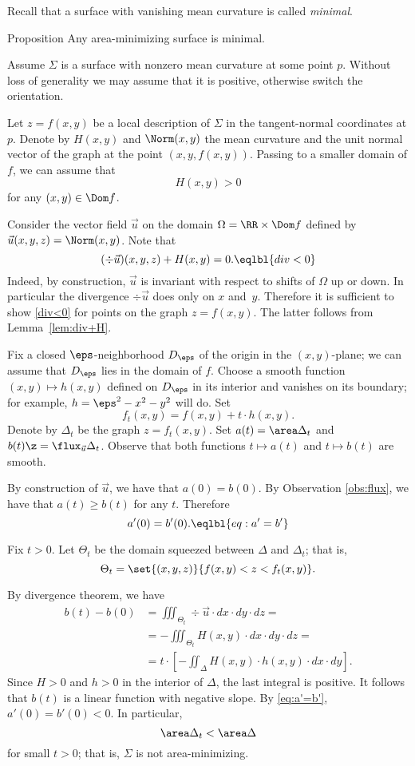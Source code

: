 Recall that a surface with vanishing mean curvature is called {}\emph{minimal}.


\begin{thm}{Proposition}\label{prop:minimizing-is-minimal}
Any area-minimizing surface is minimal.
\end{thm}



Assume $\Sigma$ is a surface with nonzero mean curvature at some point $p$.
Without loss of generality we may assume that it is positive,
otherwise switch the orientation.

Let $z=f(x,y)$ be a local description of $\Sigma$ in the tangent-normal coordinates at $p$.
Denote by $H(x,y)$ and $\Norm(x,y)$ the mean curvature and the unit normal vector of the graph at the point $(x,y,f(x,y))$.
Passing to a smaller domain of $f$, we can assume that 
\[H(x,y)>0\] for any $(x,y)\in\Dom f$.

Consider the vector field $\vec u$ on the domain $\Omega=\RR\times\Dom f$ defined by 
$\vec u(x,y,z)=\Norm (x,y)$.
Note that 
\[(\div \vec u)(x,y,z)+H(x,y)=0.
\eqlbl{div<0}\]
Indeed, by construction, $\vec u$ is invariant with respect to shifts of $\Omega$ up or down.
In particular the divergence $\div \vec u$ does only on $x$ and~$y$.
Therefore it is sufficient to show \ref{div<0} for points on the graph $z=f(x,y)$.
The latter follows from Lemma~\ref{lem:div+H}.

Fix a closed $\eps$-neighborhood $D_\eps$ of the origin in the $(x,y)$-plane;
we can assume that $D_\eps$ lies in the domain of $f$.
Choose a smooth function $(x,y)\mapsto h(x,y)$ defined on $D_\eps$ in its interior and vanishes on its boundary;
for example, $h=\eps^2-x^2-y^2$ will do.
Set
\[f_t(x,y)=f(x,y)+t\cdot h(x,y).\]
Denote by $\Delta_t$ be the graph $z=f_t(x,y)$.
Set $a(t)=\area\Delta_t$ and $b(t)\z=\flux_{\vec u} \Delta_t$.
Observe that both functions $t\mapsto a(t)$ and $t\mapsto b(t)$ are smooth.

By construction of $\vec u$, we have that $a(0)=b(0)$.
By Observation \ref{obs:flux}, we have that $a(t)\ge b(t)$ for any $t$.
Therefore
\[a'(0)=b'(0).\eqlbl{eq:a'=b'}\]

Fix $t>0$.
Let $\Theta_t$ be the domain squeezed between $\Delta$ and $\Delta_t$;
that is, 
\[\Theta_t=\set{(x,y,z)}{f(x,y)< z< f_t(x,y)}.\]

By divergence theorem, we have 
\begin{align*}
b(t)-b(0)&=\iiint_{\Theta_t}\div \vec u\cdot dx\cdot dy \cdot dz=
\\
&=-\iiint_{\Theta_t} H(x,y)\cdot dx\cdot dy \cdot dz=
\\
&=t\cdot\left[- \iint_\Delta H(x,y)\cdot h(x,y)\cdot dx\cdot dy\right].
\end{align*}
Since $H>0$ and $h>0$ in the interior of $\Delta$,
the last integral is positive.
It follows that $b(t)$ is a linear function with negative slope.
By \ref{eq:a'=b'}, $a'(0)=b'(0)< 0$.
In particular, 
\[\area\Delta_t<\area \Delta\] for small $t>0$;
that is, $\Sigma$ is not area-minimizing.
\qeds

